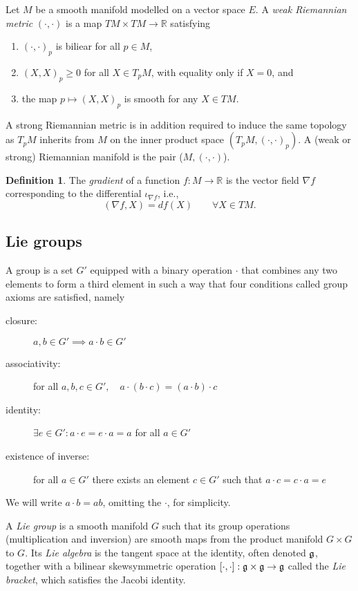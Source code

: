\documentclass{article}
\theoremstyle{plain}
\theoremstyle{definition}
\newtheorem{defin}[teo]{Definition}
\numberwithin{equation}{section}
\newcommand{\R}{\ensuremath{\mathbb{R}}}
\newcommand{\mf}{\ensuremath{\mathfrak}}
\begin{document}
Let $M$ be a smooth manifold   modelled on a vector space $E$. A \textit{weak Riemannian metric} $(\cdot,\cdot)$ is a map $TM\times TM\to\R$ satisfying 
%
\begin{enumerate}
	\item $(\cdot,\cdot)_p$ is biliear for all $p\in M$, 
	\item $(X,X)_p\geq 0$ for all $X\in T_pM$, with equality only if $X=0$, and
	\item the map $p\mapsto (X,X)_p$ is smooth for any $X\in TM$. 
\end{enumerate}
%
A strong Riemannian metric is in addition required to induce the same topology as $T_pM$ inherits from $M$ on the inner product space $\left(T_pM,(\cdot,\cdot)_p\right)$. A (weak or strong) Riemannian manifold is the pair ($M,(\cdot,\cdot)$).

\begin{defin}
	The \textit{gradient} of a function $f:M\to \R$ is the vector field $\nabla f$ corresponding to the differential $\iota_{\nabla f}$, i.e., %
	\[
	(\nabla f,X)=df(X)\qquad \forall X\in TM.
	\]
\end{defin}

\subsection{Lie groups}
A  group is a set $G'$ equipped with a binary operation $\cdot$ that combines any two elements to form a third element in such a way that four conditions called group axioms are satisfied, namely
%
\begin{description}
	\item[closure:] $a,b\in G' \implies a\cdot b\in G'$
	\item[associativity:] for all $a,b,c\in G',\quad a\cdot(b\cdot c)=(a\cdot b)\cdot c$
	\item[identity:] $\exists e\in G' : a\cdot e=e\cdot a=a$ for all $a\in G'$
	\item[existence of inverse:] for all $a\in G'$ there exists an element $c\in G'$ such that $a\cdot c=c\cdot a=e$
\end{description}
%
We will write $a\cdot b=ab$, omitting the $\cdot$, for simplicity.

A \textit{Lie group} is a smooth manifold $G$ such that its group operations (multiplication and inversion) are smooth maps from the product manifold $G\times G$ to $G$. Its \textit{Lie algebra} is the tangent space at the identity, often denoted $\mf g$, together with a bilinear skewsymmetric operation $[\cdot,\cdot]:\mf g \times \mf g \to\mf g$ called the \textit{Lie bracket}, which satisfies the Jacobi identity. 
\end{document}
